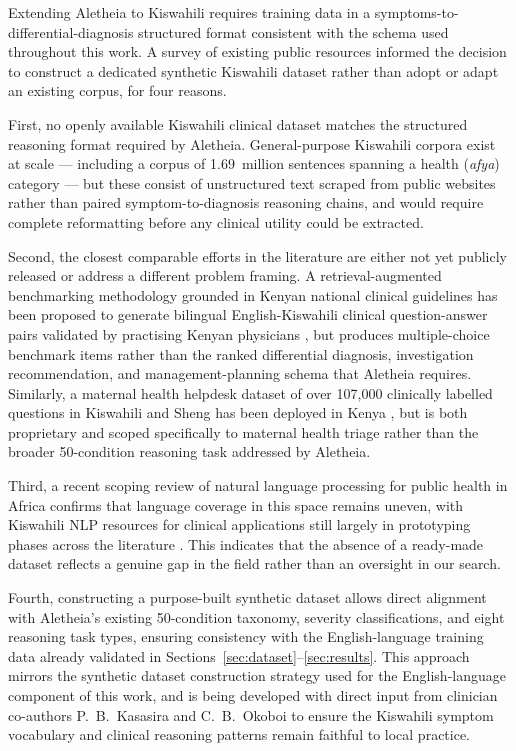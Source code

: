 \documentclass[journal]{IEEEtran}
\begin{document}
Extending Aletheia to Kiswahili requires training data in a
symptoms-to-differential-diagnosis structured format consistent
with the schema used throughout this work. A survey of existing
public resources informed the decision to construct a dedicated
synthetic Kiswahili dataset rather than adopt or adapt an existing
corpus, for four reasons.

First, no openly available Kiswahili clinical dataset matches the
structured reasoning format required by Aletheia. General-purpose
Kiswahili corpora exist at scale --- including a corpus of
1.69~million sentences spanning a health (\textit{afya}) category
\cite{swahili_corpus_2024} --- but these consist of unstructured
text scraped from public websites rather than paired
symptom-to-diagnosis reasoning chains, and would require complete
reformatting before any clinical utility could be extracted.

Second, the closest comparable efforts in the literature are either
not yet publicly released or address a different problem framing.
A retrieval-augmented benchmarking methodology grounded in Kenyan
national clinical guidelines has been proposed to generate bilingual
English-Kiswahili clinical question-answer pairs validated by
practising Kenyan physicians \cite{alama_health_qa}, but produces
multiple-choice benchmark items rather than the ranked differential
diagnosis, investigation recommendation, and management-planning
schema that Aletheia requires. Similarly, a maternal health helpdesk
dataset of over 107{,}000 clinically labelled questions in Kiswahili
and Sheng has been deployed in Kenya \cite{jacaranda_health_2023},
but is both proprietary and scoped specifically to maternal health
triage rather than the broader 50-condition reasoning task addressed
by Aletheia.

Third, a recent scoping review of natural language processing for
public health in Africa confirms that language coverage in this
space remains uneven, with Kiswahili NLP resources for clinical
applications still largely in prototyping phases across the
literature \cite{nlp_africa_scoping_2025}. This indicates that the
absence of a ready-made dataset reflects a genuine gap in the field
rather than an oversight in our search.

Fourth, constructing a purpose-built synthetic dataset allows direct
alignment with Aletheia's existing 50-condition taxonomy, severity
classifications, and eight reasoning task types, ensuring
consistency with the English-language training data already
validated in Sections~\ref{sec:dataset}--\ref{sec:results}. This
approach mirrors the synthetic dataset construction strategy used
for the English-language component of this work, and is being
developed with direct input from clinician co-authors
P.~B.~Kasasira and C.~B.~Okoboi to ensure the Kiswahili symptom
vocabulary and clinical reasoning patterns remain faithful to
local practice.
\end{document}
